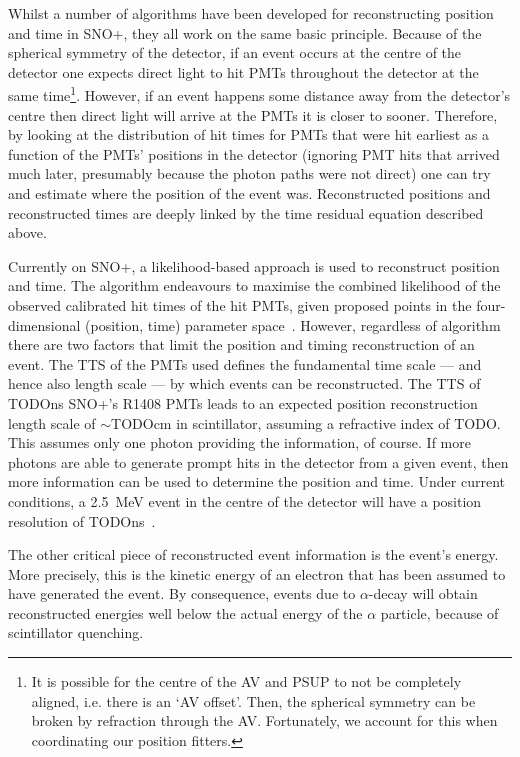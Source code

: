 Whilst a number of algorithms have been developed for reconstructing position and time in SNO+, they all work on the same basic principle. Because of the spherical symmetry of the detector, if an event occurs at the centre of the detector one expects direct light to hit PMTs throughout the detector at the same time\footnote{It is possible for the centre of the AV and PSUP to not be completely aligned, i.e. there is an `AV offset'. Then, the spherical symmetry can be broken by refraction through the AV. Fortunately, we account for this when coordinating our position fitters.}.
However, if an event happens some distance away from the detector's centre then direct light will arrive at the PMTs it is closer to sooner. Therefore, by looking at the distribution of hit times for PMTs that were hit earliest as a function of the PMTs' positions in the detector (ignoring PMT hits that arrived much later, presumably because the photon paths were not direct) one can try and estimate where the position of the event was. Reconstructed positions and reconstructed times are deeply linked by the time residual equation described above.

Currently on SNO+, a likelihood-based approach is used to reconstruct position and time. The algorithm endeavours to maximise the combined likelihood of the observed calibrated hit times of the hit PMTs, given proposed points in the four-dimensional (position, time) parameter space~\cite{}. %
However, regardless of algorithm there are two factors that limit the position and timing reconstruction of an event. The TTS of the PMTs used defines the fundamental time scale --- and hence also length scale --- by which events can be reconstructed. The TTS of TODOns %
SNO+'s R1408 PMTs leads to an expected position reconstruction length scale of $\sim$TODOcm in scintillator, %
assuming a refractive index of TODO. %
This assumes only one photon providing the information, of course. If more photons are able to generate prompt hits in the detector from a given event, then more information can be used to determine the position and time. Under current conditions, a \SI{2.5}{\MeV} event in the centre of the detector will have a position resolution of TODOns~\cite{}. %

The other critical piece of reconstructed event information is the event's energy. More precisely, this is the kinetic energy of an electron that has been assumed to have generated the event. By consequence, events due to $\alpha$-decay will obtain reconstructed energies well below the actual energy of the $\alpha$ particle, because of scintillator quenching.

